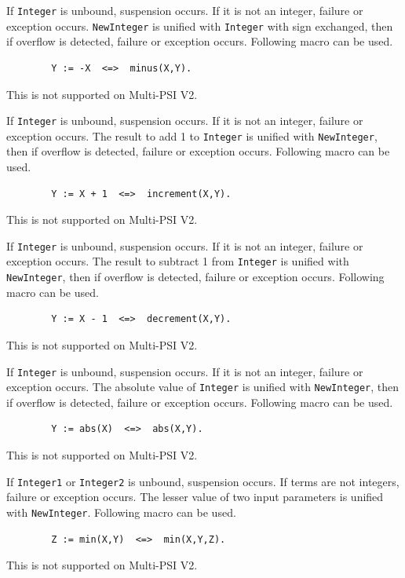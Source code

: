 \begin{itemize}
If \verb|Integer| is unbound, suspension occurs.
If it is not an integer, failure or exception occurs.
\verb|NewInteger| is unified with \verb|Integer| with sign exchanged, then
if overflow is detected, failure or exception occurs.
Following macro can be used.
\begin{verbatim}
        Y := -X  <=>  minus(X,Y).
\end{verbatim}
\Caution This is not supported on Multi-PSI V2.

\index{\verb|-|}
If \verb|Integer| is unbound, suspension occurs.
If it is not an integer, failure or exception occurs.
The result to add 1 to \verb|Integer| is unified with \verb|NewInteger|, then
if overflow is detected, failure or exception occurs.
Following macro can be used.
\begin{verbatim}
        Y := X + 1  <=>  increment(X,Y).
\end{verbatim}
\Caution This is not supported on Multi-PSI V2.

\index{\verb|+|}
If \verb|Integer| is unbound, suspension occurs.
If it is not an integer, failure or exception occurs.
The result to subtract 1 from \verb|Integer| is unified with \verb|NewInteger|,
then if overflow is detected, failure or exception occurs.
Following macro can be used.
\begin{verbatim}
        Y := X - 1  <=>  decrement(X,Y).
\end{verbatim}
\Caution This is not supported on Multi-PSI V2.

\index{\verb|-|}
If \verb|Integer| is unbound, suspension occurs.
If it is not an integer, failure or exception occurs.
The absolute value of \verb|Integer| is unified with \verb|NewInteger|,
then if overflow is detected, failure or exception occurs.
Following macro can be used.
\begin{verbatim}
        Y := abs(X)  <=>  abs(X,Y).
\end{verbatim}
\Caution This is not supported on Multi-PSI V2.

If \verb|Integer1| or \verb|Integer2| is unbound, suspension occurs.
If terms are not integers, failure or exception occurs.
The lesser value of two input parameters is unified with \verb|NewInteger|.
Following macro can be used.
\begin{verbatim}
        Z := min(X,Y)  <=>  min(X,Y,Z).
\end{verbatim}
\Caution This is not supported on Multi-PSI V2.


\end{itemize}
